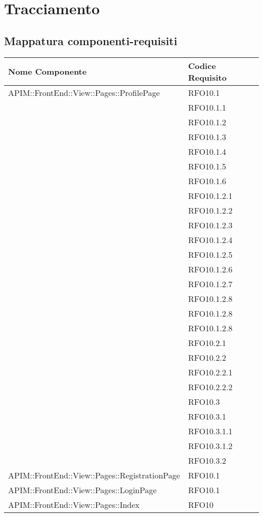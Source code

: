\newpage
\renewcommand*{\arraystretch}{1.6}

\section{Tracciamento}
\subsection{Mappatura componenti-requisiti}



		\begin{longtable}{ p{9cm} | p{5cm} }
			\hline
			\textbf{Nome Componente} & \textbf{Codice Requisito} \\
			\hline
			APIM::FrontEnd::View::Pages::ProfilePage& RFO10.1 \\
			& RFO10.1.1 \\
			& RFO10.1.2 \\
			& RFO10.1.3 \\
			& RFO10.1.4 \\
			& RFO10.1.5 \\
			& RFO10.1.6 \\
			& RFO10.1.2.1 \\
			& RFO10.1.2.2 \\
			& RFO10.1.2.3 \\
			& RFO10.1.2.4 \\
			& RFO10.1.2.5 \\
			& RFO10.1.2.6 \\
			& RFO10.1.2.7 \\
			& RFO10.1.2.8 \\
			& RFO10.1.2.8 \\
			& RFO10.1.2.8 \\
			&RFO10.2.1 \\
			&RFO10.2.2 \\
			&RFO10.2.2.1 \\
			&RFO10.2.2.2 \\
			&RFO10.3 \\
			&RFO10.3.1 \\
			&RFO10.3.1.1 \\
			&RFO10.3.1.2 \\
			&RFO10.3.2 \\
			\hline
			APIM::FrontEnd::View::Pages::RegistrationPage& RFO10.1 \\
			\hline
			APIM::FrontEnd::View::Pages::LoginPage& RFO10.1 \\
			\hline
			APIM::FrontEnd::View::Pages::Index& RFO10 \\

\end{longtable}
